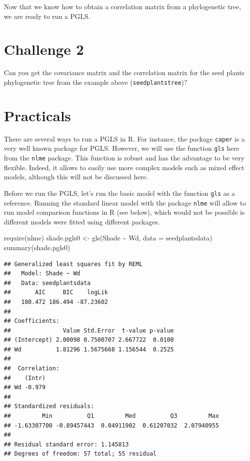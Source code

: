 \documentclass[
]{book}
\newenvironment{Shaded}{\begin{snugshade}}{\end{snugshade}}
\newcommand{\AttributeTok}[1]{\textcolor[rgb]{0.77,0.63,0.00}{#1}}
\newcommand{\FunctionTok}[1]{\textcolor[rgb]{0.00,0.00,0.00}{#1}}
\newcommand{\NormalTok}[1]{#1}
\newcommand{\OtherTok}[1]{\textcolor[rgb]{0.56,0.35,0.01}{#1}}
\newcommand{\SpecialCharTok}[1]{\textcolor[rgb]{0.00,0.00,0.00}{#1}}
\begin{document}
Now that we know how to obtain a correlation matrix from a phylogenetic tree, we are ready to run a PGLS.

\hypertarget{challenge-2}{%
\section{Challenge 2}\label{challenge-2}}

Can you get the covariance matrix and the correlation matrix for the seed plants phylogenetic tree from the example above (\texttt{seedplantstree})?

\hypertarget{practicals}{%
\section{Practicals}\label{practicals}}

There are several ways to run a PGLS in R. For instance, the package \texttt{caper} is a very well known package for PGLS. However, we will use the function \texttt{gls} here from the \texttt{nlme} package. This function is robust and has the advantage to be very flexible. Indeed, it allows to easily use more complex models such as mixed effect models, although this will not be discussed here.

Before we run the PGLS, let's run the basic model with the function \texttt{gls} as a reference. Running the standard linear model with the package \texttt{nlme} will allow to run model comparison functions in R (see below), which would not be possible is different models were fitted using different packages.

\begin{Shaded}
\begin{Highlighting}[]
\FunctionTok{require}\NormalTok{(nlme)}
\NormalTok{shade.pgls0 }\OtherTok{\textless{}{-}} \FunctionTok{gls}\NormalTok{(Shade }\SpecialCharTok{\textasciitilde{}}\NormalTok{ Wd, }\AttributeTok{data =}\NormalTok{ seedplantsdata)}
\FunctionTok{summary}\NormalTok{(shade.pgls0)}
\end{Highlighting}
\end{Shaded}

\begin{verbatim}
## Generalized least squares fit by REML
##   Model: Shade ~ Wd 
##   Data: seedplantsdata 
##       AIC     BIC    logLik
##   180.472 186.494 -87.23602
## 
## Coefficients:
##               Value Std.Error  t-value p-value
## (Intercept) 2.00098 0.7500707 2.667722  0.0100
## Wd          1.81296 1.5675668 1.156544  0.2525
## 
##  Correlation: 
##    (Intr)
## Wd -0.979
## 
## Standardized residuals:
##         Min          Q1         Med          Q3         Max 
## -1.63307700 -0.89457443  0.04911902  0.61207032  2.07940955 
## 
## Residual standard error: 1.145813 
## Degrees of freedom: 57 total; 55 residual
\end{verbatim}
\end{document}

